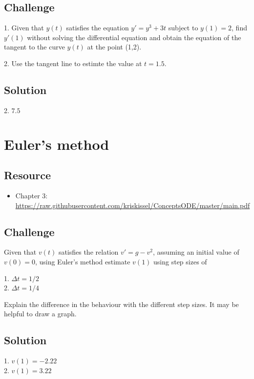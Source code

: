 \subsection*{Challenge}
1. Given that $y(t)$ satisfies the equation $y' = y^3 + 3t$ subject to $y(1) = 2$, find $y'(1)$ without solving the differential equation and obtain the equation of the tangent to the curve $y(t)$ at the point (1,2).

2. Use the tangent line to estimte the value at $t = 1.5$.

\subsection*{Solution}
2. $7.5$




\newpage
\section{Euler's method}
\label{sec:euler}

\subsection*{Resource}
\begin{itemize}
    \item Chapter 3: \url{https://raw.githubusercontent.com/kriskissel/ConceptsODE/master/main.pdf}
\end{itemize}

\subsection*{Challenge}
Given that $v(t)$ satisfies the relation $v' = g - v^2$, assuming an initial value of $v(0)=0$, using Euler's method estimate $v(1)$ using step sizes of

1. $\Delta t = 1/2$\\
2. $\Delta t = 1/4$

Explain the difference in the behaviour with the different step sizes. It may be helpful to draw a graph.

\subsection*{Solution}
1. $v(1) = -2.22$\\
2. $v(1) = 3.22$



